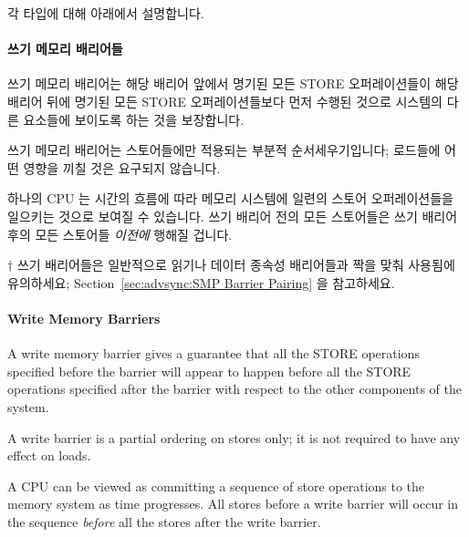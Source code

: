 \begin{enumerate}
각 타입에 대해 아래에서 설명합니다.

\paragraph{쓰기 메모리 배리어들}

쓰기 메모리 배리어는 해당 배리어 앞에서 명기된 모든 STORE 오퍼레이션들이 해당
배리어 뒤에 명기된 모든 STORE 오퍼레이션들보다 먼저 수행된 것으로 시스템의 다른
요소들에 보이도록 하는 것을 보장합니다.

쓰기 메모리 배리어는 스토어들에만 적용되는 부분적 순서세우기입니다; 로드들에
어떤 영향을 끼칠 것은 요구되지 않습니다.

하나의 CPU 는 시간의 흐름에 따라 메모리 시스템에 일련의 스토어 오퍼레이션들을
일으키는 것으로 보여질 수 있습니다.
쓰기 배리어 전의 모든 스토어들은 쓰기 배리어 후의 모든 스토어들 \emph{이전에}
행해질 겁니다.

$\dagger$ 쓰기 배리어들은 일반적으로 읽기나 데이터 종속성 배리어들과 짝을 맞춰
사용됨에 유의하세요; Section~\ref{sec:advsync:SMP Barrier Pairing} 을
참고하세요.
\iffalse

\paragraph{Write Memory Barriers}

A write memory barrier gives a guarantee that all the STORE operations
specified before the barrier will appear to happen before all the STORE
operations specified after the barrier with respect to the other
components of the system.

A write barrier is a partial ordering on stores only; it is not required
to have any effect on loads.

A CPU can be viewed as committing a sequence of store operations to the
memory system as time progresses.  All stores before a write barrier will
occur in the sequence \emph{before} all the stores after the write barrier.


\end{enumerate}
